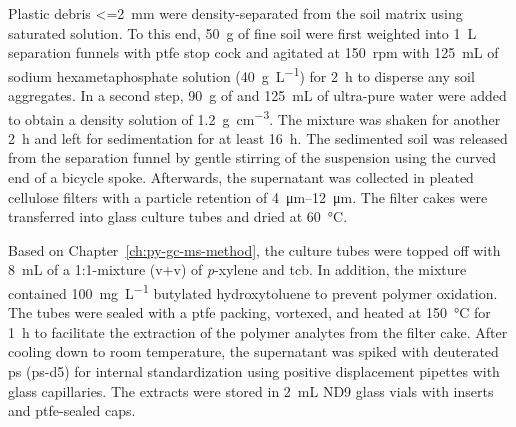 Plastic debris \SI{<=2}{\milli\meter} were density-separated from the soil matrix using saturated  solution. To this end, \SI{50}{\gram} of fine soil were first weighted into \SI{1}{\liter} separation funnels with \ac{ptfe} stop cock and agitated at \SI{150}{rpm} with \SI{125}{\milli\liter} of sodium hexametaphosphate solution (\SI{40}{\gram\per\liter}) for \SI{2}{\hour} to disperse any soil aggregates. In a second step, \SI{90}{\gram} of  and \SI{125}{\milli\liter} of ultra-pure water were added to obtain a density solution of \SI{1.2}{\gram\per\cubic\centi\meter}. The mixture was shaken for another \SI{2}{\hour} and left for sedimentation for at least \SI{16}{\hour}. The sedimented soil was released from the separation funnel by gentle stirring of the suspension using the curved end of a bicycle spoke. Afterwards, the supernatant was collected in pleated cellulose filters with a particle retention of \SIrange{4}{12}{\micro\meter}. The filter cakes were transferred into glass culture tubes  and dried at \SI{60}{\degreeCelsius}.

Based on Chapter~\ref{ch:py-gc-ms-method}, the culture tubes were topped off with \SI{8}{\milli\liter} of a 1:1-mixture (v+v) of \textit{p}-xylene and \ac{tcb}. In addition, the mixture contained \SI{100}{\milli\gram\per\liter} butylated hydroxytoluene to prevent polymer oxidation.
The tubes were sealed with a \ac{ptfe} packing, vortexed, and heated at \SI{150}{\degreeCelsius} for \SI{1}{\hour} to facilitate the extraction of the polymer analytes from the filter cake.
After cooling down to room temperature, the supernatant was spiked with deuterated \ac{ps} (\ac{ps}-d5) for internal standardization using positive displacement pipettes with glass capillaries. The extracts were stored in \SI{2}{\milli\liter} ND9 glass vials with inserts and \ac{ptfe}-sealed caps.

